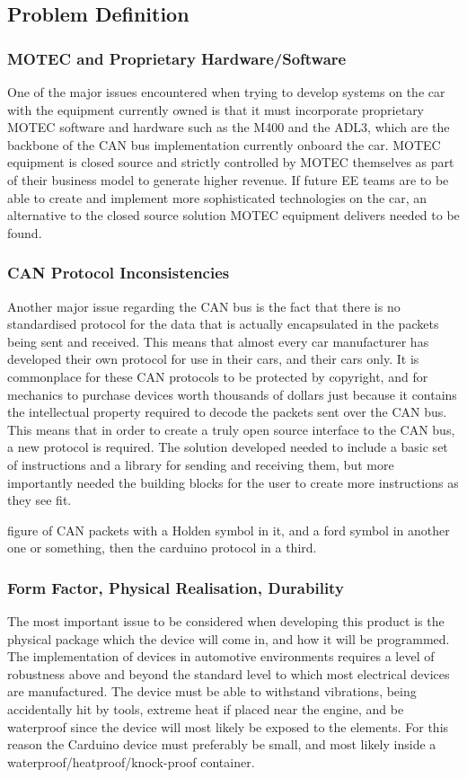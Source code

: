 \subsection{Problem Definition}
\subsubsection{MOTEC and Proprietary Hardware/Software}
One of the major issues encountered when trying to develop systems on the car with the equipment currently owned is that it must incorporate proprietary MOTEC software and hardware such as the M400 and the ADL3, which are the backbone of the CAN bus implementation currently onboard the car. MOTEC equipment is closed source and strictly controlled by MOTEC themselves as part of their business model to generate higher revenue\cite{MOTEC_prices}. If future EE teams are to be able to create and implement more sophisticated technologies on the car, an alternative to the closed source solution MOTEC equipment delivers needed to be found. 

\subsubsection{CAN Protocol Inconsistencies}
Another major issue regarding the CAN bus is the fact that there is no standardised protocol for the data that is actually encapsulated in the packets being sent and received. This means that almost every car manufacturer has developed their own protocol for use in their cars, and their cars only. It is commonplace for these CAN protocols to be protected by copyright, and for mechanics to purchase devices worth thousands of dollars just because it contains the intellectual property required to decode the packets sent over the CAN bus. This means that in order to create a truly open source interface to the CAN bus, a new protocol is required. The solution developed needed to include a basic set of instructions and a library for sending and receiving them, but more importantly needed the building blocks for the user to create more instructions as they see fit.

figure of CAN packets with a Holden symbol in it, and a ford symbol in another one or something, then the carduino protocol in a third.

\subsubsection{Form Factor, Physical Realisation, Durability}
The most important issue to be considered when developing this product is the physical package which the device will come in, and how it will be programmed. The implementation of devices in automotive environments requires a level of robustness above and beyond the standard level to which most electrical devices are manufactured. The device must be able to withstand vibrations, being accidentally hit by tools, extreme heat if placed near the engine, and be waterproof since the device will most likely be exposed to the elements. For this reason the Carduino device must preferably be small, and most likely inside a waterproof/heatproof/knock-proof container.

